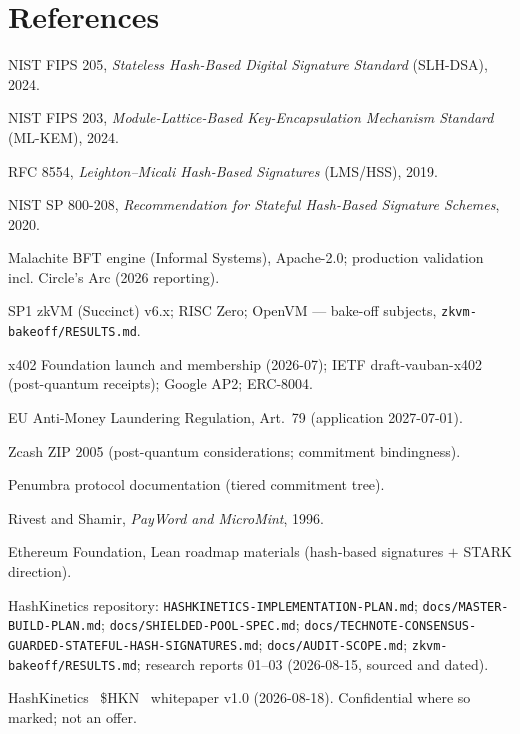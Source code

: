 \documentclass[11pt]{article}
\newcommand{\HKN}{\$HKN}
\newcommand{\ct}[1]{\texttt{#1}}
\begin{document}
\section*{References}
\begin{enumerate}[leftmargin=1.6em,itemsep=1pt,label={[\arabic*]}]
  \item NIST FIPS 205, \emph{Stateless Hash-Based Digital Signature Standard} (SLH-DSA), 2024.
  \item NIST FIPS 203, \emph{Module-Lattice-Based Key-Encapsulation Mechanism Standard} (ML-KEM), 2024.
  \item RFC 8554, \emph{Leighton--Micali Hash-Based Signatures} (LMS/HSS), 2019.
  \item NIST SP 800-208, \emph{Recommendation for Stateful Hash-Based Signature Schemes}, 2020.
  \item Malachite BFT engine (Informal Systems), Apache-2.0; production validation incl. Circle's Arc (2026 reporting).
  \item SP1 zkVM (Succinct) v6.x; RISC Zero; OpenVM --- bake-off subjects, \ct{zkvm-bakeoff/RESULTS.md}.
  \item x402 Foundation launch and membership (2026-07); IETF draft-vauban-x402 (post-quantum receipts); Google AP2; ERC-8004.
  \item EU Anti-Money Laundering Regulation, Art.~79 (application 2027-07-01).
  \item Zcash ZIP 2005 (post-quantum considerations; commitment bindingness).
  \item Penumbra protocol documentation (tiered commitment tree).
  \item Rivest and Shamir, \emph{PayWord and MicroMint}, 1996.
  \item Ethereum Foundation, Lean roadmap materials (hash-based signatures $+$ STARK direction).
  \item HashKinetics repository: \ct{HASHKINETICS-IMPLEMENTATION-PLAN.md}; \ct{docs/MASTER-BUILD-PLAN.md}; \ct{docs/SHIELDED-POOL-SPEC.md}; \ct{docs/TECHNOTE-CONSENSUS-GUARDED-STATEFUL-HASH-SIGNATURES.md}; \ct{docs/AUDIT-SCOPE.md}; \ct{zkvm-bakeoff/RESULTS.md}; research reports 01--03 (2026-08-15, sourced and dated).
\end{enumerate}

\vspace{0.8em}
\noindent\textcolor{hkmuted}{\small HashKinetics \textperiodcentered\ \HKN{} \textperiodcentered\ whitepaper v1.0 (2026-08-18). Confidential where so marked; not an offer.}
\end{document}
